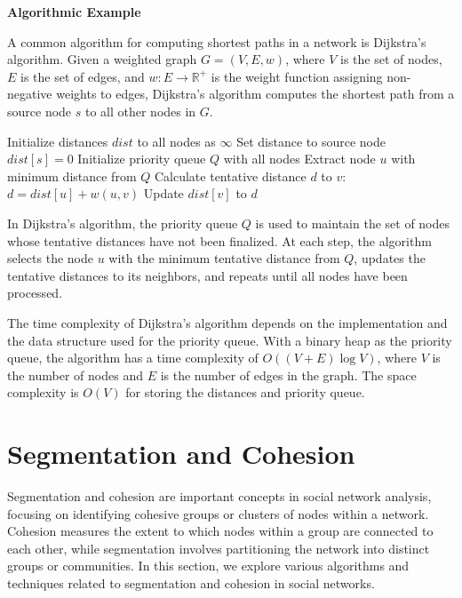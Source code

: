 \documentclass[12pt]{book} %
\begin{document}
\textbf{Algorithmic Example}

A common algorithm for computing shortest paths in a network is Dijkstra's algorithm. Given a weighted graph \(G = (V, E, w)\), where \(V\) is the set of nodes, \(E\) is the set of edges, and \(w : E \rightarrow \mathbb{R}^+\) is the weight function assigning non-negative weights to edges, Dijkstra's algorithm computes the shortest path from a source node \(s\) to all other nodes in \(G\).
\FloatBarrier
\begin{algorithm}[H]
\caption{Dijkstra's Algorithm}
\begin{algorithmic}[1]
    \State Initialize distances $dist$ to all nodes as $\infty$
    \State Set distance to source node $dist[s] = 0$
    \State Initialize priority queue $Q$ with all nodes
        \State Extract node $u$ with minimum distance from $Q$
            \State Calculate tentative distance $d$ to $v$: $d = dist[u] + w(u, v)$
                \State Update $dist[v]$ to $d$
            \EndIf
        \EndFor
    \EndWhile
\EndFunction
\end{algorithmic}
\end{algorithm}
\FloatBarrier
In Dijkstra's algorithm, the priority queue \(Q\) is used to maintain the set of nodes whose tentative distances have not been finalized. At each step, the algorithm selects the node \(u\) with the minimum tentative distance from \(Q\), updates the tentative distances to its neighbors, and repeats until all nodes have been processed.

The time complexity of Dijkstra's algorithm depends on the implementation and the data structure used for the priority queue. With a binary heap as the priority queue, the algorithm has a time complexity of \(O((V + E) \log V)\), where \(V\) is the number of nodes and \(E\) is the number of edges in the graph. The space complexity is \(O(V)\) for storing the distances and priority queue.

\section{Segmentation and Cohesion}

Segmentation and cohesion are important concepts in social network analysis, focusing on identifying cohesive groups or clusters of nodes within a network. Cohesion measures the extent to which nodes within a group are connected to each other, while segmentation involves partitioning the network into distinct groups or communities. In this section, we explore various algorithms and techniques related to segmentation and cohesion in social networks.
\end{document}
